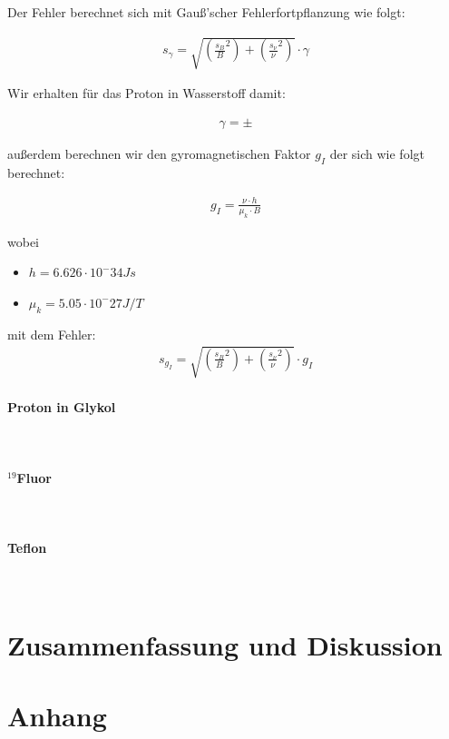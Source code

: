 \documentclass[12pt]{article}
\begin{document}
Der Fehler berechnet sich mit Gauß'scher Fehlerfortpflanzung wie folgt:

\begin{align*}
s_{\gamma} = \sqrt{\left(\frac{s_B}{B}^2\right)+\left(\frac{s_\nu}{\nu}^2 \right)}\cdot \gamma
\end{align*}

Wir erhalten für das Proton in Wasserstoff damit: 

\begin{align*}
\gamma =  \pm
\end{align*}

außerdem berechnen wir den gyromagnetischen Faktor $g_I$ der sich wie folgt berechnet: 

\begin{align*}
g_I = \frac{\nu \cdot h}{\mu_k \cdot B}
\end{align*}

wobei 
\begin{itemize}
	\item $h =  6.626 \cdot 10^-34 Js$
	\item $\mu_k = 5.05 \cdot 10^-27 J/T$
\end{itemize}

mit dem Fehler:
\begin{align*}
s_{g_I} = \sqrt{\left(\frac{s_B}{B}^2\right)+\left(\frac{s_\nu}{\nu}^2 \right)}\cdot g_I
\end{align*}


\paragraph{Proton in Glykol}
\ \\
\paragraph{$^{19}$Fluor}
\ \\
\paragraph{Teflon}
\ \\

\newpage
\section{Zusammenfassung und Diskussion}


\newpage
\section{Anhang}
\end{document}
